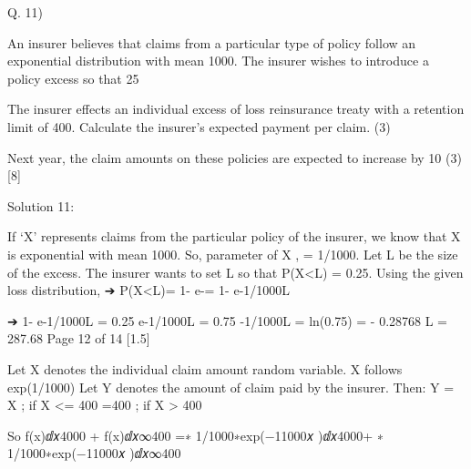 Q. 11)
\item  An insurer believes that claims from a particular type of policy follow an exponential distribution with mean 1000. The insurer wishes to introduce a policy excess so that 25%

\item   The insurer effects an individual excess of loss reinsurance treaty with a retention limit of 400. Calculate the insurer’s expected payment per claim.
(3)
\item   Next year, the claim amounts on these policies are expected to increase by 10%
(3)
[8]

Solution 11:
\item 
If ‘X’ represents claims from the particular policy of the insurer, we know that X is exponential with mean 1000.
So, parameter of X , \lambda= 1/1000.
Let L be the size of the excess. The insurer wants to set L so that P(X<L) = 0.25.
Using the given loss distribution,
➔ P(X<L)= 1- e-\lambdaL = 1- e-1/1000L

➔ 1- e-1/1000L = 0.25
e-1/1000L = 0.75
-1/1000L = ln(0.75)
= - 0.28768
L = 287.68
Page 12 of 14
[1.5]

\item  
Let X denotes the individual claim amount random variable. X follows exp(1/1000)
Let Y denotes the amount of claim paid by the insurer. Then:
Y = X ; if X <= 400
=400 ; if X > 400

So
\intx f(x)ⅆ𝑥4000 + \intx f(x)ⅆ𝑥∞400
=\intx∗ 1/1000∗exp(−11000𝑥 )ⅆ𝑥4000+ ∗ 1/1000∗exp(−11000𝑥 )ⅆ𝑥∞400

